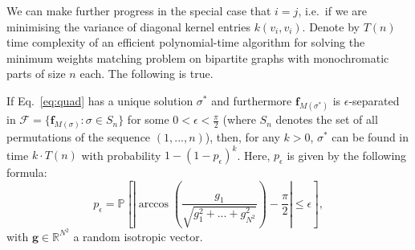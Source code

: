 We can make further progress in the special case 
that $i=j$, i.e.~if we are minimising the variance of diagonal kernel entries $k(v_i,v_i)$. 
Denote by $T(n)$ time complexity of an efficient polynomial-time algorithm for solving the minimum weights matching problem on bipartite graphs with monochromatic parts of size $n$ each.
The following is true.

\begin{lemma} \label{lemma:k_matching_lemma}
If Eq.~\ref{eq:quad} has a unique solution $\sigma^{*}$ and furthermore $\mathbf{f}_{M(\sigma^{*})}$ is $\epsilon$-separated in $\mathcal{F}=\{\mathbf{f}_{M(\sigma)}: \sigma \in S_n\}$ for some $0<\epsilon<\frac{\pi}{2}$ (where $S_n$ denotes the set of all permutations of the sequence $(1,...,n)$), then, for any $k>0$, $\sigma^{*}$ can be found in time $k \cdot T(n)$ with probability $1-(1-p_{\epsilon})^{k}$.
Here, $p_{\epsilon}$ is given by the following formula:
\begin{equation}
p_{\epsilon} = 
\mathbb{P}\left[\left|\arccos \left(\frac{g_{1}}{\sqrt{g_{1}^{2}+...+g_{N^{2}}^{2}}} \right)-\frac{\pi}{2}\right| \leq \epsilon \right],    
\end{equation}
with $\mathbf{g} \in \mathbb{R}^{N^2}$ a random isotropic vector. 
\end{lemma}

